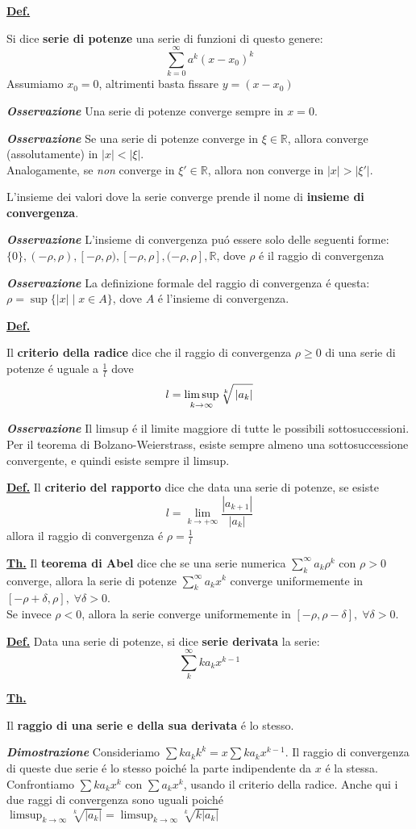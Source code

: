 \documentclass[a4paper,10pt]{article} %
\renewcommand{\b}[1]{%
    {\textbf{#1}}}
\newcommand{\ldef}[1]{%
    {\smallbreak\par\normalsize\textbf{\underline{Def.}} {#1} \smallbreak}}
\newcommand{\ltheorem}[1]{%
    {\smallbreak\par\normalsize\textbf{\underline{Th.}} {#1} \smallbreak\par}}
\newcommand{\ldim}[1]{%
    {\smallbreak\par\scriptsize\emph{\textbf{Dimostrazione}} {#1} \par}}
\newcommand{\loss}[1]{%
    {\smallbreak\par\scriptsize\emph{\textbf{Osservazione}} {#1} \par}}
\begin{document}
\begin{multicols}{2}
\ldef{
    Si dice \b{serie di potenze} una serie di funzioni di questo genere:
    $$ 
        \sum_{k=0}^\infty a^k (x - x_0)^k
    $$
    Assumiamo $x_0 = 0$, altrimenti basta fissare $y = (x - x_0)$
    \loss{
        Una serie di potenze converge sempre in $ x = 0 $.
    }
    \loss{
        Se una serie di potenze converge in $ \xi \in \mathbb{R} $, allora converge (assolutamente) in $ |x| < |\xi|$.\\
        Analogamente, se \emph{non} converge in $ \xi'  \in \mathbb{R} $, allora non converge in $ |x| > |\xi'|$.
    }
    L'insieme dei valori dove la serie converge prende il nome di \b{insieme di convergenza}. 
    \loss{
        L'insieme di convergenza pu\'{o} essere solo delle seguenti forme: 
        $\{0\}, (-\rho, \rho), [-\rho, \rho), \left[-\rho, \rho\right], (-\rho, \rho], \mathbb{R}$, dove $\rho$ \'{e} il raggio di convergenza
    }
    \loss{
        La definizione formale del raggio di convergenza \'{e} questa:
        $ \rho = \sup \{ |x| \mid x \in A \}$, dove $A$ \'{e} l'insieme di convergenza.
    }
}

\ldef{
    Il \b{criterio della radice} dice che il raggio di convergenza $ \rho \geq 0 $ di una serie 
    di potenze \'{e} uguale a $\frac{1}{l}$ dove 
    $$
    l = \limsup_{k\to\infty} \sqrt[k]{\vphantom{\sum} \left| a_k \right| }
    $$
    \loss{
        Il limsup \'{e} il limite maggiore di tutte le possibili sottosuccessioni. Per il teorema di Bolzano-Weierstrass, esiste sempre almeno una sottosuccessione convergente, e quindi esiste sempre il limsup.
        }
}

\ldef{
    Il \b{criterio del rapporto} dice che data una serie di potenze, se esiste
    $$
        l = \lim_{k\to+\infty} \frac{|a_{k+1}|}{|a_k|}
    $$
    allora il raggio di convergenza \'{e} $ \rho = \frac{1}{l}$
}

\ltheorem{
    Il \b{teorema di Abel} dice che se una serie numerica $ \sum_k^\infty a_k \rho^k $ con $ \rho > 0 $ converge, allora la serie di potenze $ \sum_k^\infty a_k x^k$ converge uniformemente in $[-\rho + \delta, \rho ], \; \forall \delta > 0$. \\
    Se invece $ \rho < 0$, allora la serie converge uniformemente in $[-\rho, \rho - \delta], \; \forall \delta > 0$.
}

\ldef{
    Data una serie di potenze, si dice \b{serie derivata } la serie:
    $$
    \sum_k^\infty k a_k x^{k-1}
    $$
}

\ltheorem{
    Il \b{raggio di una serie e della sua derivata} \'{e} lo stesso.
    \ldim{
        Consideriamo $\sum k a_k k^k = x \sum k a_k x^{k-1}$.
        Il raggio di convergenza di queste due serie \'{e} lo stesso poich\'{e} la parte indipendente da $x$ \'{e} la stessa. Confrontiamo $\sum k a_k x^k$ con $\sum a_k x^k$, usando il criterio della radice. Anche qui i due raggi di convergenza sono uguali poich\'{e} $\limsup_{k\to\infty} \sqrt[k]{|a_k|} = \limsup_{k\to\infty} \sqrt[k]{k|a_k|}$
    }
}


\end{multicols}
\end{document}
